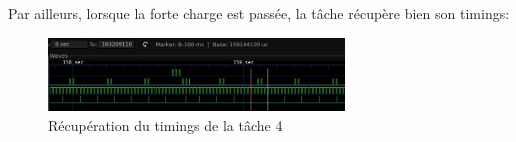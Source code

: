 \documentclass[11pt, a4paper]{article}
\begin{document}
Par ailleurs, lorsque la forte charge est passée, la tâche récupère bien son timings:

\begin{figure}[H]
    \begin{center}
        \includegraphics[width=0.7\textwidth]{section4_send_t4_leds_5}
    \end{center}
    \caption{Récupération du timings de la tâche 4}
    \label{Récupération du timings de la tâche 4}
\end{figure}
\end{document}
